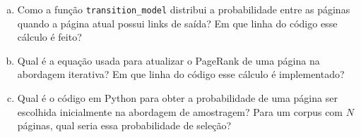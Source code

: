 \documentclass[a4paper,12pt]{article}
\begin{document}
\begin{enumerate} [a)]
    \item Como a função \texttt{transition\_model} distribui a probabilidade entre as páginas quando a página atual possui links de saída? Em que linha do código esse cálculo é feito?
    \item Qual é a equação usada para atualizar o PageRank de uma página na abordagem iterativa? Em que linha do código esse cálculo é implementado?
    \item Qual é o código em Python para obter a probabilidade de uma página ser escolhida inicialmente na abordagem de amostragem? Para um corpus com $N$ páginas, qual seria essa probabilidade de seleção?
\end{enumerate}
\end{document}
